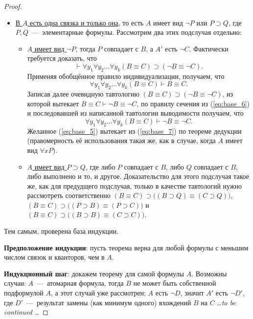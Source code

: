 \begin{proof}
\begin{itemize}
        \item \underline{В $A$ есть одна связка и только она}, то есть $A$ имеет вид $\neg P$ или $P \supset Q$, где $P, Q$~---~элементарные формулы. Рассмотрим два этих подслучая отдельно:
        \begin{itemize}
            \item \underline{$A$ имеет вид $\neg P$}, тогда $P$ совпадает с $B$, а $A'$ есть $\neg C$. Фактически требуется доказать, что
            \begin{equation}\label{eq:base_5}
                \vdash \forall y_1\forall y_2\dots\forall y_k(B \equiv C) \supset (\neg B \equiv \neg C).
            \end{equation}
            Применяя обобщённое правило индивидуализации, получаем, что 
            \begin{equation}\label{eq:base_6}
                \forall y_1\forall y_2\dots\forall y_k(B \equiv C) \vdash B \equiv C. 
            \end{equation}
            Записав далее очевидную тавтологию $(B \equiv C) \supset (\neg B \equiv \neg C)$, из которой вытекает $B \equiv C \vdash \neg B \equiv \neg C$, по правилу сечения из (\ref{eq:base_6}) и последовавшей из написанной тавтологии выводимости получаем, что
            \begin{equation}\label{eq:base_7}
                \forall y_1\forall y_2\dots\forall y_k(B \equiv C) \vdash \neg B \equiv \neg C.
            \end{equation}
            Желанное (\ref{eq:base_5}) вытекает из (\ref{eq:base_7}) по теореме дедукции (правомерность её использования такая же, как в случае, когда $A$ имеет вид $\forall xP$).

            \item \underline{$A$ имеет вид $P \supset Q$}, где либо $P$ совпадает с $B$, либо $Q$ совпадает с $B$, либо выполнено и то, и другое. Доказательство для этого подслучая такое же, как для предудщего подслучая, только в качестве тавтологий нужно рассмотреть соответственно $(B \equiv C) \supset \big((B \supset Q) \equiv (C \supset Q)\big)$, $(B \equiv C) \supset \big((P \supset B) \equiv (P \supset C)\big)$ и $(B \equiv C) \supset \big((B \supset B) \equiv (C \supset C)\big)$.
        \end{itemize}
    \end{itemize}

    Тем самым, проверена база индукции.

    \textbf{Предположение индукции}: пусть теорема верна для любой формулы с меньшим числом связок и кванторов, чем в $A$.

    \textbf{Индукционный шаг}: докажем теорему для самой формулы $A$. Возможны случаи: $A$~---~атомарная формула, тогда $B$ не может быть собственной подформулой $A$, а этот случай уже рассмотрен; $A$ есть $\neg D$, значит $A'$ есть $\neg D'$, где $D'$~---~результат замены (как минимум одного) вхождений $B$ на $C$ \dots \textit{to be continued} \dots

\end{proof}